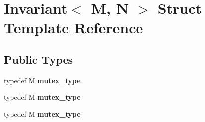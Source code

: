 \hypertarget{structInvariant}{}\section{Invariant$<$ M, N $>$ Struct Template Reference}
\label{structInvariant}
\subsection*{Public Types}
\begin{DoxyCompactItemize}
\item 
\hypertarget{structInvariant_acf61ffc1f9b39e1ff8c7d00356330413}{}typedef M {\bfseries mutex\+\_\+type}\label{structInvariant_acf61ffc1f9b39e1ff8c7d00356330413}

\item 
\hypertarget{structInvariant_acf61ffc1f9b39e1ff8c7d00356330413}{}typedef M {\bfseries mutex\+\_\+type}\label{structInvariant_acf61ffc1f9b39e1ff8c7d00356330413}

\item 
\hypertarget{structInvariant_acf61ffc1f9b39e1ff8c7d00356330413}{}typedef M {\bfseries mutex\+\_\+type}\label{structInvariant_acf61ffc1f9b39e1ff8c7d00356330413}

\end{DoxyCompactItemize}
